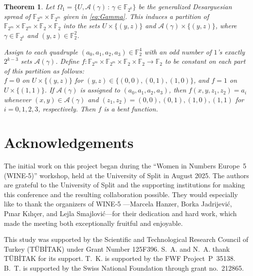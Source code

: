\documentclass[12pt]{article}
\theoremstyle{plain}
\newtheorem{theorem}{Theorem}
\theoremstyle{definition}
\newcommand{\F}{\mathbb{F}}
\renewcommand{\to}{\rightarrow}
\begin{document}
	\begin{theorem}
		\label{thmparti}
		Let $\Omega_1=\{U,\mathcal{A}(\gamma)\,:\,\gamma\in\F_{2^k}\}$ 
		be the generalized Desarguesian spread of 
		$\F_{2^m}\times\F_{2^m}$ given in \eqref{eq:Gamma}. 
		This induces a partition of 
		$\F_{2^m}\times\F_{2^m}\times\F_2\times\F_2$ 
		into the sets $U\times\{(y,z)\}$ and 
		$\mathcal{A}(\gamma)\times\{(y,z)\}$, 
		where $\gamma\in\F_{2^k}$ and $(y,z)\in\F_2^2$. 
		
		Assign to each quadruple $(a_0,a_1,a_2,a_3)\in\F_2^4$ 
		with an odd number of $1$'s exactly $2^{k-3}$ sets 
		$\mathcal{A}(\gamma)$. Define 
		$f:\F_{2^m}\times\F_{2^m}\times\F_2\times\F_2\to\F_2$ 
		to be constant on each part of this partition as follows:\\
		$f=0$ on $U\times\{(y,z)\}$ for $(y,z)\in\{(0,0),(0,1),(1,0)\}$, 
		and $f=1$ on $U\times\{(1,1)\}$. 
		If $\mathcal{A}(\gamma)$ is assigned to $(a_0,a_1,a_2,a_3)$, 
		then $f(x,y,z_1,z_2)=a_i$ whenever 
		$(x,y)\in\mathcal{A}(\gamma)$ and 
		$(z_1,z_2)=(0,0),(0,1),(1,0),(1,1)$ 
		for $i=0,1,2,3$, respectively. 
		Then $f$ is a bent function.
	\end{theorem}

	
	\section*{Acknowledgements}
	
	The initial work on this project began during the “Women in Numbers Europe~5 (WINE-5)” workshop, held at the University of Split in August 2025. The authors are grateful to the University of Split and the supporting institutions for making this conference and the resulting collaboration possible. They would especially like to thank the organizers of WINE-5 —Marcela Hanzer, Borka Jadrijević, Pınar Kılıçer, and Lejla Smajlović—for their dedication and hard work, which made the meeting both exceptionally fruitful and enjoyable.
	
	This study was supported by the Scientific and Technological Research  Council of Turkey (TÜBİTAK) under Grant Number 125F396. S.~A. and N.~A. thank TÜBİTAK for its support.
	T.~K. is supported by the FWF Project~P~35138.
	B.~T. is supported by the Swiss National Foundation through grant no.~212865.
	
\end{document}
